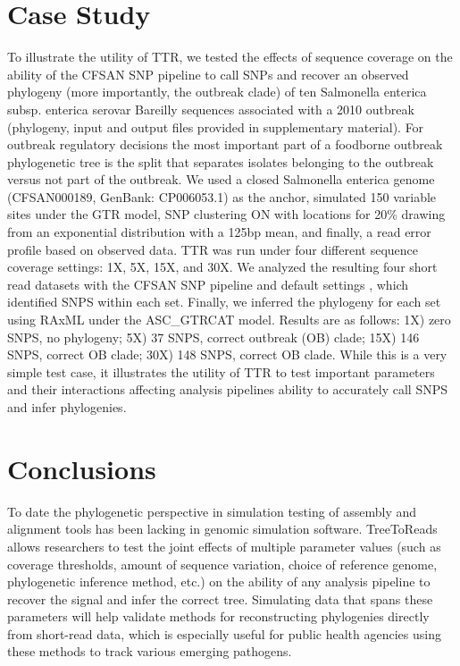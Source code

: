 \section{Case Study}
To illustrate the utility of TTR, we tested the effects of sequence coverage on the ability of the CFSAN SNP pipeline \citep{davis_cfsan_2015} 
to call SNPs and recover an observed phylogeny (more importantly, the outbreak clade) of ten Salmonella enterica subsp. enterica serovar Bareilly sequences 
associated with a 2010 outbreak \citep{hoffmann_tracing_2015} (phylogeny, input and output files provided in supplementary material). 
For outbreak regulatory decisions the most important part of a foodborne outbreak phylogenetic tree is the split that separates isolates belonging to the outbreak versus not part of the outbreak. 
We used a closed Salmonella enterica genome (CFSAN000189, GenBank: CP006053.1) as the anchor, simulated 150 variable sites under the GTR model, 
SNP clustering ON with locations for 20\% drawing from an exponential distribution with a 125bp mean, and finally, a read error profile based on observed data. 
TTR was run under four different sequence coverage settings: 1X, 5X, 15X, and 30X. 
We analyzed the resulting four short read datasets with the CFSAN SNP pipeline and default settings \citep{davis_cfsan_2015}, 
which identified SNPS within each set. 
Finally, we inferred the phylogeny for each set using RAxML \citep{stamatakis_raxml_2014} under the ASC\_GTRCAT model.  
Results are as follows: 1X) zero SNPS, no phylogeny; 5X) 37 SNPS, correct outbreak (OB) clade; 15X) 146 SNPS, correct OB clade; 30X) 148 SNPS, correct OB clade.  
While this is a very simple test case, it illustrates the utility of TTR to test important parameters and their interactions affecting analysis pipelines ability to accurately call SNPS and infer phylogenies.

\section{Conclusions}
To date the phylogenetic perspective in simulation testing of assembly and alignment tools has been lacking in genomic simulation software. 
TreeToReads allows researchers to test the joint effects of multiple parameter values (such as coverage thresholds, 
amount of sequence variation, choice of reference genome, phylogenetic inference method, etc.) on the ability of any analysis pipeline to recover the signal and infer the correct tree. 
Simulating data that spans these parameters will help validate methods for reconstructing phylogenies directly from short-read data, 
which is especially useful for public health agencies using these methods to track various emerging pathogens. 




